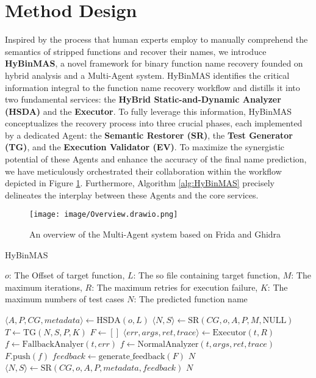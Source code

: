 \documentclass[acmsmall,screen,review,anonymous]{acmart} %
\begin{document}
\section{Method Design}
Inspired by the process that human experts employ to manually comprehend the semantics of stripped functions and recover their names, we introduce \textbf{HyBinMAS}, a novel framework for binary function name recovery founded on hybrid analysis and a Multi-Agent system. HyBinMAS identifies the critical information integral to the function name recovery workflow and distills it into two fundamental services: the \textbf{HyBrid Static-and-Dynamic Analyzer (HSDA)} and the \textbf{Executor}. To fully leverage this information, HyBinMAS conceptualizes the recovery process into three crucial phases, each implemented by a dedicated Agent: the \textbf{Semantic Restorer (SR)}, the \textbf{Test Generator (TG)}, and the \textbf{Execution Validator (EV)}. To maximize the synergistic potential of these Agents and enhance the accuracy of the final name prediction, we have meticulously orchestrated their collaboration within the workflow depicted in Figure \ref{fig:overview}. Furthermore, Algorithm \ref{alg:HyBinMAS} precisely delineates the interplay between these Agents and the core services.
\begin{figure}[h] %
    \centering
    \texttt{[image: image/Overview.drawio.png]} %
    \caption{An overview of the Multi-Agent system based on Frida and Ghidra} %
    \label{fig:overview} %
\end{figure}
\begin{algorithm}
  \caption{HyBinMAS}
  \label{alg:HyBinMAS}
  \begin{algorithmic}[1]
    \REQUIRE $o$: The Offset of target function, $L$: The so file containing target function, $M$: The maximum iterations, $R$: The maximum retries for execution failure, $K$: The maximum numbers of test cases
    \ENSURE $N$: The predicted function name
    
    \STATE $\langle A, P, CG, metadata \rangle \gets \text{HSDA}(o, L)$
    \STATE $\langle N, S \rangle \gets \text{SR}(CG, o, A, P, M, \text{NULL})$
        \STATE $T \gets \text{TG}(N, S, P, K)$
        \STATE $F \gets []$
            \STATE $\langle err, args, ret, trace \rangle \gets \text{Executor}(t, R)$
                \STATE $f \gets \text{FallbackAnalyer}(t, err)$
            \ELSE
                \STATE $f \gets \text{NormalAnalyzer}(t, args, ret, trace)$
            \ENDIF
            \STATE $F.\text{push}(f)$
        \ENDFOR
        \STATE $feedback \gets \text{generate\_feedback}(F)$
            \RETURN $N$
        \ENDIF
        \STATE $\langle N, S \rangle \gets \text{SR}(CG, o, A, P, metadata, feedback)$
    \ENDFOR
    \RETURN $N$
  \end{algorithmic}
\end{algorithm}
\end{document}
